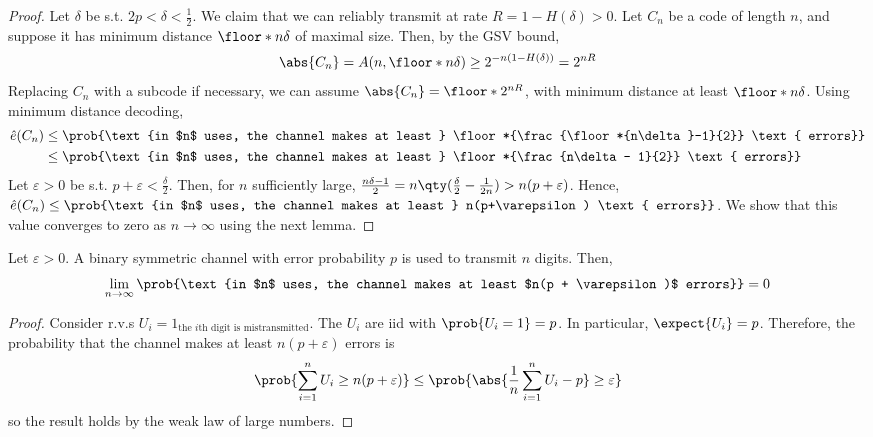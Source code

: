 \begin{proof}
    Let $\delta$ be s.t. $2p < \delta < \frac{1}{2}$.
    We claim that we can reliably transmit at rate $R = 1 - H(\delta) > 0$.
    Let $C_n$ be a code of length $n$, and suppose it has minimum distance $\floor*{n\delta}$ of maximal size.
    Then, by the GSV bound,
    \begin{align*}
        \abs{C_n} = A(n, \floor*{n\delta}) \geq 2^{-n(1-H(\delta))} = 2^{nR}
    \end{align*}
    Replacing $C_n$ with a subcode if necessary, we can assume $\abs{C_n} = \floor*{2^{nR}}$, with minimum distance at least $\floor*{n\delta}$.
    Using minimum distance decoding,
    \begin{align*}
        \hat e(C_n) &\leq \prob{\text{in $n$ uses, the channel makes at least } \floor*{\frac{\floor*{n\delta}-1}{2}} \text{ errors}} \\
        &\leq \prob{\text{in $n$ uses, the channel makes at least } \floor*{\frac{n\delta - 1}{2}} \text{ errors}}
    \end{align*}
    Let $\varepsilon > 0$ be s.t. $p + \varepsilon < \frac{\delta}{2}$.
    Then, for $n$ sufficiently large, $\frac{n\delta - 1}{2} = n\qty(\frac{\delta}{2} - \frac{1}{2n}) > n(p + \varepsilon)$.
    Hence, $\hat e(C_n) \leq \prob{\text{in $n$ uses, the channel makes at least } n(p+\varepsilon) \text{ errors}}$.
    We show that this value converges to zero as $n \to \infty$ using the next lemma.
\end{proof}

\begin{lemma}
    Let $\varepsilon > 0$.
    A binary symmetric channel with error probability $p$ is used to transmit $n$ digits.
    Then,
    \begin{align*}
        \lim_{n \to \infty} \prob{\text{in $n$ uses, the channel makes at least $n(p + \varepsilon)$ errors}} = 0
    \end{align*}
\end{lemma}

\begin{proof}
    Consider r.v.s $U_i = 1_\text{the $i$th digit is mistransmitted}$.
    The $U_i$ are iid with $\prob{U_i = 1} = p$.
    In particular, $\expect{U_i} = p$.
    Therefore, the probability that the channel makes at least $n(p + \varepsilon)$ errors is
    \begin{align*}
        \prob{\sum_{i=1}^n U_i \geq n(p + \varepsilon)} \leq \prob{\abs{\frac{1}{n} \sum_{i=1}^n U_i - p} \geq \varepsilon}
    \end{align*}
    so the result holds by the weak law of large numbers.
\end{proof}

